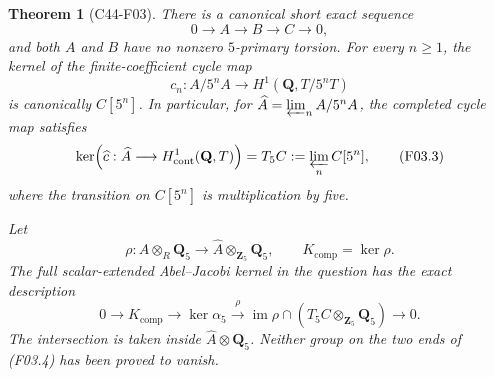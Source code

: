 \documentclass[11pt]{article}
\newtheorem{theorem}{Theorem}[section]
\theoremstyle{remark}\newtheorem{remark}[theorem]{Remark}
\begin{document}
\begin{theorem}[C44-F03]\label{C44-F03}
There is a canonical short exact sequence
\[
                 0\longrightarrow A\longrightarrow B
                   \longrightarrow C\longrightarrow0,
 \tag{F03.2}
\]
and both $A$ and $B$ have no nonzero $5$-primary torsion.
For every $n\ge1$, the kernel of the finite-coefficient cycle map
\[
 c_n:A/5^nA\longrightarrow H^1(\mathbf Q,T/5^nT)
\]
is canonically $C[5^n]$.  In particular, for
$\widehat A=\varprojlim_n A/5^nA$, the completed cycle map satisfies
\[
 \ker\!\left(\widehat c:\widehat A\longrightarrow
                    H^1_{\mathrm{cont}}(\mathbf Q,T)\right)
          = T_5C:=\varprojlim_n C[5^n],            \tag{F03.3}
\]
where the transition on $C[5^n]$ is multiplication by five.

Let
\[
 \rho:A\otimes_R\mathbf Q_5\longrightarrow
                  \widehat A\otimes_{\mathbf Z_5}\mathbf Q_5,
 \qquad K_{\mathrm{comp}}=\ker\rho.
\]
The full scalar-extended Abel--Jacobi kernel in the question has
the exact description
\[
 0\longrightarrow K_{\mathrm{comp}}
 \longrightarrow\ker\alpha_5
 \xrightarrow{\rho}
 \operatorname{im}\rho\cap
             (T_5C\otimes_{\mathbf Z_5}\mathbf Q_5)
 \longrightarrow0.                              \tag{F03.4}
\]
The intersection is taken inside
$\widehat A\otimes\mathbf Q_5$.  Neither group on the two ends
of (F03.4) has been proved to vanish.
\end{theorem}
\end{document}
